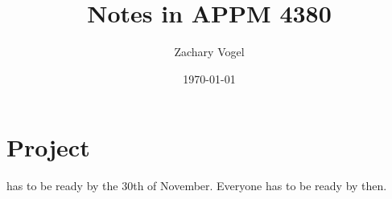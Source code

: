 \documentclass{article}
\author{Zachary Vogel}
\title{Notes in APPM 4380}
\date{\today}
\begin{document}
\maketitle
\section{Project}
has to be ready by the 30th of November. Everyone has to be ready by then.\\
\end{document}
